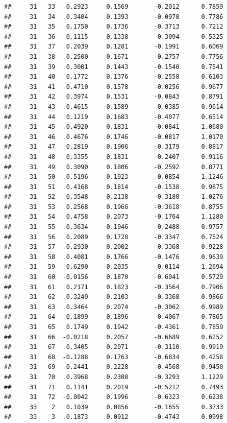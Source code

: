 \documentclass[
]{article}
\begin{document}
\begin{verbatim}
##     31   33   0.2923     0.1569       -0.2012      0.7859  
##     31   34   0.3404     0.1393       -0.0978      0.7786  
##     31   35   0.1750     0.1736       -0.3713      0.7212  
##     31   36   0.1115     0.1338       -0.3094      0.5325  
##     31   37   0.2039     0.1281       -0.1991      0.6069  
##     31   38   0.2500     0.1671       -0.2757      0.7756  
##     31   39   0.3001     0.1443       -0.1540      0.7541  
##     31   40   0.1772     0.1376       -0.2558      0.6103  
##     31   41   0.4710     0.1578       -0.0256      0.9677  
##     31   42   0.3974     0.1531       -0.0843      0.8791  
##     31   43   0.4615     0.1589       -0.0385      0.9614  
##     31   44   0.1219     0.1683       -0.4077      0.6514  
##     31   45   0.4920     0.1831       -0.0841      1.0680  
##     31   46   0.4676     0.1746       -0.0817      1.0170  
##     31   47   0.2819     0.1906       -0.3179      0.8817  
##     31   48   0.3355     0.1831       -0.2407      0.9116  
##     31   49   0.3090     0.1806       -0.2592      0.8771  
##     31   50   0.5196     0.1923       -0.0854      1.1246  
##     31   51   0.4168     0.1814       -0.1538      0.9875  
##     31   52   0.3548     0.2138       -0.3180      1.0276  
##     31   53   0.2568     0.1966       -0.3618      0.8755  
##     31   54   0.4758     0.2073       -0.1764      1.1280  
##     31   55   0.3634     0.1946       -0.2488      0.9757  
##     31   56   0.2089     0.1728       -0.3347      0.7524  
##     31   57   0.2930     0.2002       -0.3368      0.9228  
##     31   58   0.4081     0.1766       -0.1476      0.9639  
##     31   59   0.6290     0.2035       -0.0114      1.2694  
##     31   60  -0.0156     0.1870       -0.6041      0.5729  
##     31   61   0.2171     0.1823       -0.3564      0.7906  
##     31   62   0.3249     0.2103       -0.3368      0.9866  
##     31   63   0.3464     0.2074       -0.3062      0.9989  
##     31   64   0.1899     0.1896       -0.4067      0.7865  
##     31   65   0.1749     0.1942       -0.4361      0.7859  
##     31   66  -0.0218     0.2057       -0.6689      0.6252  
##     31   67   0.3405     0.2071       -0.3110      0.9919  
##     31   68  -0.1288     0.1763       -0.6834      0.4258  
##     31   69   0.2441     0.2228       -0.4568      0.9450  
##     31   70   0.3968     0.2308       -0.3293      1.1229  
##     31   71   0.1141     0.2019       -0.5212      0.7493  
##     31   72  -0.0042     0.1996       -0.6323      0.6238  
##     33    2   0.1039     0.0856       -0.1655      0.3733  
##     33    3  -0.1873     0.0912       -0.4743      0.0998  

\end{verbatim}
\end{document}
